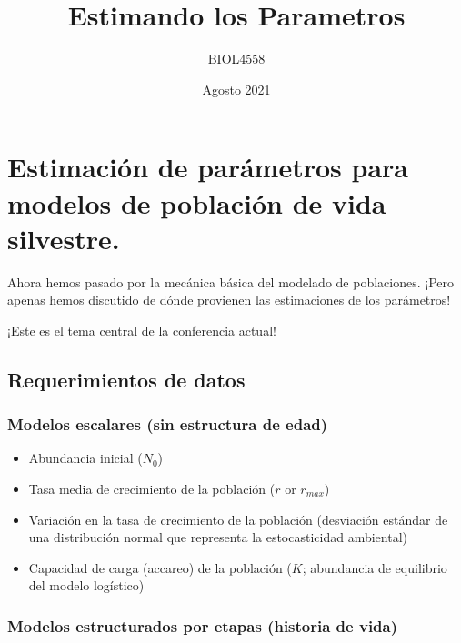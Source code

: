 \documentclass[
]{article}
\title{Estimando los Parametros}
\author{BIOL4558}
\date{Agosto 2021}
\providecommand{\tightlist}{%
  \setlength{\itemsep}{0pt}\setlength{\parskip}{0pt}}
\begin{document}
\maketitle

{
\setcounter{tocdepth}{2}
\tableofcontents
}
\hypertarget{estimaciuxf3n-de-paruxe1metros-para-modelos-de-poblaciuxf3n-de-vida-silvestre.}{%
\section{Estimación de parámetros para modelos de población de vida
silvestre.}\label{estimaciuxf3n-de-paruxe1metros-para-modelos-de-poblaciuxf3n-de-vida-silvestre.}}

Ahora hemos pasado por la mecánica básica del modelado de poblaciones.
¡Pero apenas hemos discutido de dónde provienen las estimaciones de los
parámetros!

¡Este es el tema central de la conferencia actual!

\hypertarget{requerimientos-de-datos}{%
\subsection{Requerimientos de datos}\label{requerimientos-de-datos}}

\hypertarget{modelos-escalares-sin-estructura-de-edad}{%
\subsubsection{Modelos escalares (sin estructura de
edad)}\label{modelos-escalares-sin-estructura-de-edad}}

\begin{itemize}
\tightlist
\item
  Abundancia inicial (\(N_0\))
\item
  Tasa media de crecimiento de la población (\(r\) or \(r_{max}\))
\item
  Variación en la tasa de crecimiento de la población (desviación
  estándar de una distribución normal que representa la estocasticidad
  ambiental)
\item
  Capacidad de carga (accareo) de la población (\(K\); abundancia de
  equilibrio del modelo logístico)
\end{itemize}

\hypertarget{modelos-estructurados-por-etapas-historia-de-vida}{%
\subsubsection{Modelos estructurados por etapas (historia de
vida)}\label{modelos-estructurados-por-etapas-historia-de-vida}}
\end{document}
